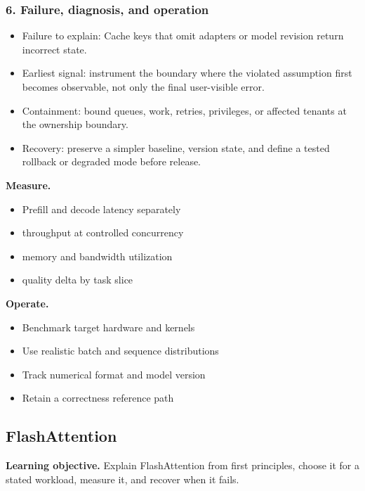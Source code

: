 \subsubsection*{6. Failure, diagnosis, and operation}
\begin{itemize}
\item Failure to explain: Cache keys that omit adapters or model revision return incorrect state.
\item Earliest signal: instrument the boundary where the violated assumption first becomes observable, not only the final user-visible error.
\item Containment: bound queues, work, retries, privileges, or affected tenants at the ownership boundary.
\item Recovery: preserve a simpler baseline, version state, and define a tested rollback or degraded mode before release.
\end{itemize}
\textbf{Measure.}\begin{itemize}
\item Prefill and decode latency separately
\item throughput at controlled concurrency
\item memory and bandwidth utilization
\item quality delta by task slice
\end{itemize}
\textbf{Operate.}\begin{itemize}
\item Benchmark target hardware and kernels
\item Use realistic batch and sequence distributions
\item Track numerical format and model version
\item Retain a correctness reference path
\end{itemize}
\subsection{FlashAttention}
\textbf{Learning objective.} Explain FlashAttention from first principles, choose it for a stated workload, measure it, and recover when it fails.

